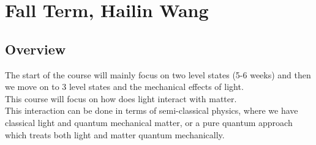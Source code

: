 \chapter{Fall Term, Hailin Wang}
\section{Overview}
The start of the course will mainly focus on two level states (5-6 weeks) and then we move on to 3 level states and the mechanical effects of light. \\
This course will focus on how does light interact with matter.\\
This interaction can be done in terms of semi-classical physics, where we have classical light and quantum mechanical matter, or a pure quantum approach which treats both light and matter quantum mechanically.\\

